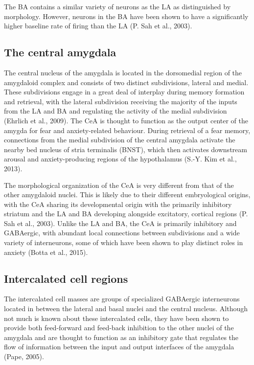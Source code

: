 \documentclass[12pt,a4paperpaper,]{report}
\begin{document}
The BA contains a similar variety of neurons as the LA as distinguished
by morphology. However, neurons in the BA have been shown to have a
significantly higher baseline rate of firing than the LA (P. Sah et al.,
2003).

\subsection{The central amygdala}\label{the-central-amygdala}

The central nucleus of the amygdala is located in the dorsomedial region
of the amygdaloid complex and consists of two distinct subdivisions,
lateral and medial. These subdivisions engage in a great deal of
interplay during memory formation and retrieval, with the lateral
subdivision receiving the majority of the inputs from the LA and BA and
regulating the activity of the medial subdivision (Ehrlich et al.,
2009). The CeA is thought to function as the output center of the amygda
for fear and anxiety-related behaviour. During retrieval of a fear
memory, connections from the medial subdivision of the central amygdala
activate the nearby bed nucleus of stria terminalis (BNST), which then
activates downstream arousal and anxiety-producing regions of the
hypothalamus (S.-Y. Kim et al., 2013).

The morphological organization of the CeA is very different from that of
the other amygdaloid nuclei. This is likely due to their different
embryological origins, with the CeA sharing its developmental origin
with the primarily inhibitory striatum and the LA and BA developing
alongside excitatory, cortical regions (P. Sah et al., 2003). Unlike the
LA and BA, the CeA is primarily inhibitory and GABAergic, with abundant
local connections between subdivisions and a wide variety of
interneurons, some of which have been shown to play distinct roles in
anxiety (Botta et al., 2015).

\subsection{Intercalated cell regions}\label{intercalated-cell-regions}

The intercalated cell masses are groups of specialized GABAergic
interneurons located in between the lateral and basal nuclei and the
central nucleus. Although not much is known about these intercalated
cells, they have been shown to provide both feed-forward and feed-back
inhibition to the other nuclei of the amygdala and are thought to
function as an inhibitory gate that regulates the flow of information
between the input and output interfaces of the amygdala (Pape, 2005).
\end{document}
